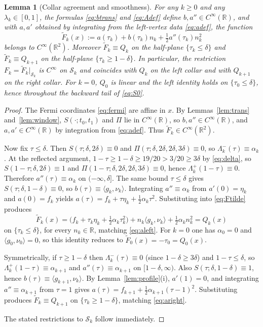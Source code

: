 \documentclass[11pt]{article}
\newtheorem{lemma}[theorem]{Lemma}
\newcommand{\R}{\mathbb{R}}
\newcommand{\ip}[2]{\langle #1,#2\rangle}
\begin{document}
\begin{lemma}[Collar agreement and smoothness]
\label{lem:collar}
For any $k\ge0$ and any $\lambda_k\in[0,1]$, the formulas \eqref{eq:btrans} and \eqref{eq:Adef} define $b,a''\in C^\infty(\R)$, and with $a,a'$ obtained by integrating from the left-vertex data \eqref{eq:adef}, the function
\begin{equation}
\label{eq:Ftilde}
\widetilde F_k(x) := a(\tau_k)+b(\tau_k)n_k+\tfrac12 a''(\tau_k)n_k^2
\end{equation}
belongs to $C^\infty(\R^2)$. Moreover $\widetilde F_k\equiv Q_k$ on the half-plane $\{\tau_k\le\delta\}$ and $\widetilde F_k\equiv Q_{k+1}$ on the half-plane $\{\tau_k\ge 1-\delta\}$. In particular, the restriction $F_k=\widetilde F_k\big|_{\mathcal S_k}$ is $C^\infty$ on $\mathcal S_k$ and coincides with $Q_k$ on the left collar and with $Q_{k+1}$ on the right collar. For $k=0$, $Q_0$ is linear and the left identity holds on $\{\tau_0\le\delta\}$, hence throughout the backward tail of \eqref{eq:S0}.
\end{lemma}

\begin{proof}
The Fermi coordinates \eqref{eq:fermi} are affine in $x$. By Lemmas~\ref{lem:trans} and~\ref{lem:window}, $S(\cdot;t_0,t_1)$ and $\Pi$ lie in $C^\infty(\R)$, so $b,a''\in C^\infty(\R)$, and $a,a'\in C^\infty(\R)$ by integration from \eqref{eq:adef}. Thus $\widetilde F_k\in C^\infty(\R^2)$.

Now fix $\tau\le\delta$. Then $S(\tau;\delta,2\delta)\equiv0$ and $\Pi(\tau;\delta,2\delta,2\delta,3\delta)\equiv0$, so $\Lambda_k^-(\tau)\equiv\alpha_k$. At the reflected argument, $1-\tau\ge 1-\delta\ge 19/20>3/20\ge 3\delta$ by \eqref{eq:delta}, so $S(1-\tau;\delta,2\delta)\equiv1$ and $\Pi(1-\tau;\delta,2\delta,2\delta,3\delta)\equiv0$, hence $\Lambda_k^+(1-\tau)\equiv0$. Therefore $a''(\tau)\equiv\alpha_k$ on $(-\infty,\delta]$. The same bound $\tau\le\delta$ gives $S(\tau;\delta,1-\delta)\equiv0$, so $b(\tau)\equiv\ip{g_k}{\nu_k}$. Integrating $a''\equiv\alpha_k$ from $a'(0)=\eta_k$ and $a(0)=f_k$ yields $a(\tau)=f_k+\tau\eta_k+\tfrac12\alpha_k\tau^2$. Substituting into \eqref{eq:Ftilde} produces
\[
\widetilde F_k(x)
= \bigl(f_k+\tau_k\eta_k+\tfrac12\alpha_k\tau_k^2\bigr)+n_k\ip{g_k}{\nu_k}+\tfrac12\alpha_k n_k^2
= Q_k(x)
\]
on $\{\tau_k\le\delta\}$, for every $n_k\in\R$, matching \eqref{eq:aleft}. For $k=0$ one has $\alpha_0=0$ and $\ip{g_0}{\nu_0}=0$, so this identity reduces to $\widetilde F_0(x)=-\tau_0=Q_0(x)$.

Symmetrically, if $\tau\ge 1-\delta$ then $\Lambda_k^-(\tau)\equiv0$ (since $1-\delta\ge 3\delta$) and $1-\tau\le\delta$, so $\Lambda_k^+(1-\tau)\equiv\alpha_{k+1}$ and $a''(\tau)\equiv\alpha_{k+1}$ on $[1-\delta,\infty)$. Also $S(\tau;\delta,1-\delta)\equiv1$, hence $b(\tau)\equiv\ip{g_{k+1}}{\nu_k}$. By Lemma~\ref{lem:profile}(i), $a'(1)=0$, and integrating $a''\equiv\alpha_{k+1}$ from $\tau=1$ gives $a(\tau)=f_{k+1}+\tfrac12\alpha_{k+1}(\tau-1)^2$. Substituting produces $\widetilde F_k\equiv Q_{k+1}$ on $\{\tau_k\ge 1-\delta\}$, matching \eqref{eq:aright}.

The stated restrictions to $\mathcal S_k$ follow immediately.
\end{proof}
\end{document}
